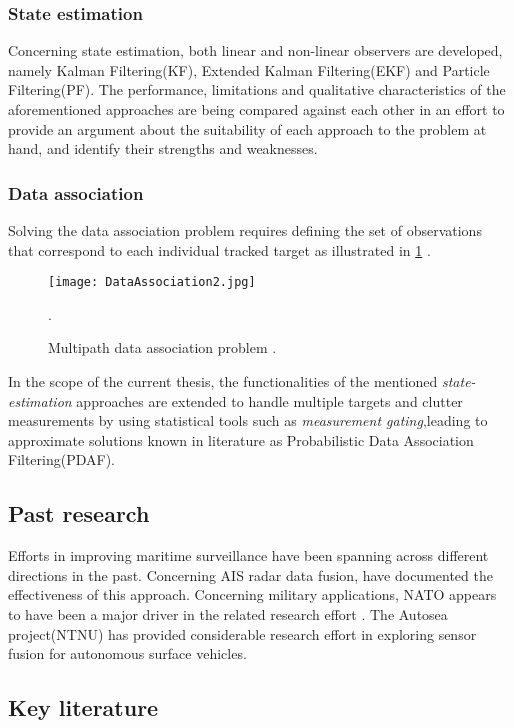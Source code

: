 \subsubsection{State estimation}
Concerning state estimation, both linear and non-linear observers are developed, namely Kalman Filtering(KF), Extended Kalman Filtering(EKF) and Particle Filtering(PF). The performance, limitations and qualitative characteristics of the aforementioned approaches are being compared against each other in an effort to provide an argument about the suitability of each approach to the problem at hand, and identify their strengths and weaknesses.
\subsubsection{Data association}
Solving the data association problem requires defining the set of observations that correspond to each individual tracked target as illustrated in \cref{fig:MultipathDA} .


\begin{figure}[H]
	\centering
	\texttt{[image: DataAssociation2.jpg]}
	\caption{ Multipath data association problem \cite{Lan2019}.}.
	\label{fig:MultipathDA}
\end{figure}

In the scope of the current thesis, the functionalities of the mentioned \emph{state-estimation} approaches are extended to handle multiple targets and clutter measurements by using statistical tools such as \emph{measurement gating},leading to approximate solutions known in literature as Probabilistic Data Association Filtering(PDAF). 

\subsection{Past research}
Efforts in improving maritime surveillance have been spanning across different directions in the past. Concerning  AIS radar data fusion,  \cite{Habtemariam2015}  \cite{Heymann2015} have documented the effectiveness of this approach. Concerning military applications, NATO appears to have been a major driver in the related research effort \cite{Guerriero2008,9781586035365}. The Autosea project(NTNU)  \cite{Brekke2019}has provided considerable research effort in exploring sensor fusion for autonomous surface vehicles.
\subsection{Key literature}


